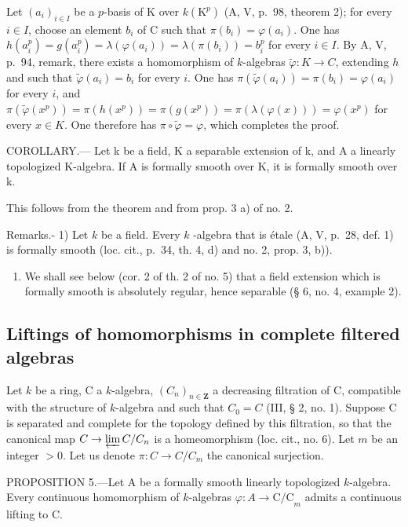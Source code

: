 Let \((a_{i})_{i\in I}\) be a \(p\)-basis of K over \(k(\mathrm{K}^p)\) (A, V, p.~98, theorem 2); for every \(i\in I\), choose an element \(b_{i}\) of C such that \(\pi(b_{i})=\varphi(a_{i})\). One has \(h(a_{i}^{p})=g(a_{i}^{p})=\lambda(\varphi(a_{i}))=\lambda(\pi(b_{i}))=b_{i}^{p}\) for every \(i\in I\). By A, V, p.~94, remark, there exists a homomorphism of \(k\)-algebras \(\tilde{\varphi}:K\to C\), extending \(h\) and such that \(\tilde{\varphi}(a_{i})=b_{i}\) for every \(i\). One has \(\pi(\tilde{\varphi}(a_{i}))=\pi(b_{i})=\varphi(a_{i})\) for every \(i\), and \(\pi(\tilde{\varphi}(x^{p}))=\pi(h(x^{p}))=\pi(g(x^{p}))=\pi(\lambda(\varphi(x)))=\varphi(x^{p})\) for every \(x\in K\). One therefore has \(\pi\circ\tilde{\varphi}=\varphi\), which completes the proof.

COROLLARY.--- Let k be a field, K a separable extension of k, and A a linearly topologized K-algebra. If A is formally smooth over K, it is formally smooth over k.

This follows from the theorem and from prop. 3 a) of no. 2.

Remarks.- 1) Let \(k\) be a field. Every \(k\) -algebra that is étale (A, V, p.~28, def. 1) is formally smooth (loc. cit., p.~34, th. 4, d) and no. 2, prop. 3, b)).

\begin{enumerate}
\def\labelenumi{\arabic{enumi})}
\setcounter{enumi}{1}
\tightlist
\item
  We shall see below (cor. 2 of th. 2 of no. 5) that a field extension which is formally smooth is absolutely regular, hence separable (§ 6, no. 4, example 2).
\end{enumerate}

\subsection{Liftings of homomorphisms in complete filtered algebras}

Let \(k\) be a ring, C a \(k\)-algebra, \((C_n)_{n \in \mathbf{Z}}\) a decreasing filtration of C, compatible with the structure of \(k\)-algebra and such that \(C_0 = C\) (III, § 2, no. 1). Suppose C is separated and complete for the topology defined by this filtration, so that the canonical map \(C \to \varprojlim C / C_n\) is a homeomorphism (loc. cit., no. 6). Let \(m\) be an integer \(>0\). Let us denote \(\pi: C \to C / C_m\) the canonical surjection.

PROPOSITION 5.—Let A be a formally smooth linearly topologized \(k\)-algebra. Every continuous homomorphism of \(k\)-algebras \(\varphi: A \to \mathrm{C/C}_{m}\) admits a continuous lifting to C.

